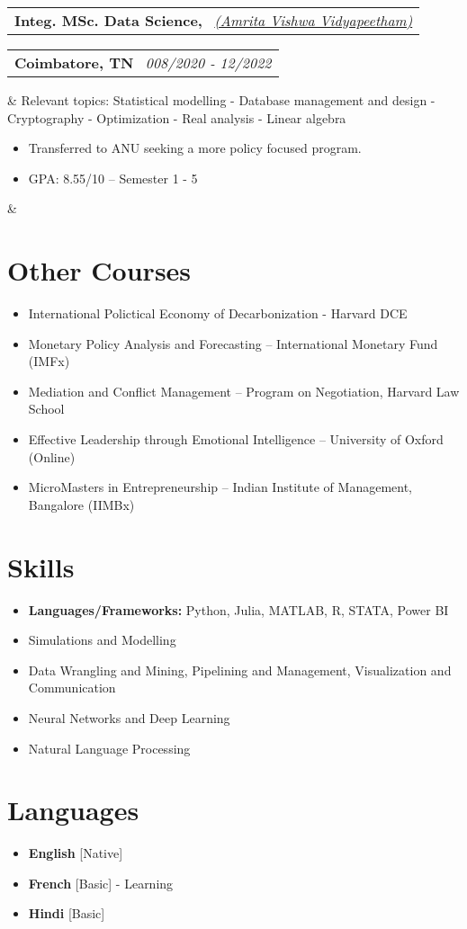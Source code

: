 \documentclass[11pt,a4paper,sans]{moderncv}
\makeatletter
\newcommand*{\customcventry}[7][.13em]{
\begin{tabular}{@{}l}
{\bfseries #4} \
{\itshape #3}
\end{tabular}
\hfill
\begin{tabular}{l@{}}
{\bfseries #5} \
{\itshape #2}
\end{tabular}
\ifx&#7&%
\else{\
\begin{minipage}{\maincolumnwidth}%
\small#7%
\end{minipage}}\fi%
\par\addvspace{#1}}
\makeatother
\begin{document}
\customcventry{008/2020 ‐ 12/2022}{{\color{blue}\href{https://www.amrita.edu/}{(Amrita Vishwa Vidyapeetham)}}}{Integ. MSc. Data Science,}{Coimbatore, TN}{}{
Relevant topics: Statistical modelling - Database management and design - Cryptography - Optimization - Real analysis - Linear algebra
{\begin{itemize}[leftmargin=0.6cm, label={\textbullet}]
\item Transferred to ANU seeking a more policy focused program.
\item GPA: 8.55/10 – Semester 1 - 5
\end{itemize}}}

\section{Other Courses}
{\begin{itemize}[label=\textbullet]
    \item International Polictical Economy of Decarbonization - Harvard DCE
    \item Monetary Policy Analysis and Forecasting – International Monetary Fund (IMFx)
    \item Mediation and Conflict Management – Program on Negotiation, Harvard Law School
    \item Effective Leadership through Emotional Intelligence – University of Oxford (Online)
    \item MicroMasters in Entrepreneurship – Indian Institute of Management, Bangalore (IIMBx)

  \end{itemize}}

\section{Skills}
{\begin{itemize}[label=\textbullet]
\item {\textbf{Languages/Frameworks:} Python, Julia, MATLAB, R, STATA, Power BI}
\item Simulations and Modelling
\item Data Wrangling and Mining, Pipelining and Management, Visualization and Communication
\item Neural Networks and Deep Learning
\item Natural Language Processing
\end{itemize}}

\section{Languages}
\begin{multicols}{2}
    \begin{itemize}[label=\textbullet]
    \item \textbf{English} [Native]
    \item {\textbf{French} [Basic] - Learning}
    \item {\textbf{Hindi} [Basic]}
    \end{itemize}
\end{multicols}
\end{document}
